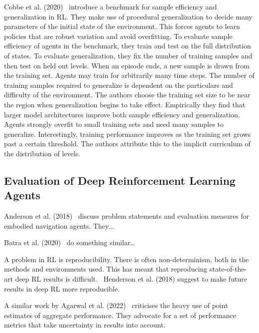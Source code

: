 
Cobbe et al. (2020)~\cite{cobbe_procgen_2020} introduce a benchmark for sample efficiency and generalization in RL.
They make use of procedural generalization to decide many parameters of the initial state of the environment.
This forces agents to learn policies that are robust variation and avoid overfitting.
To evaluate sample efficiency of agents in the benchmark, they train and test on the full distribution of states.
To evaluate generalization, they fix the number of training samples and then test on held out levels.
When an episode ends, a new sample is drawn from the training set.
Agents may train for arbitrarily many time steps.
The number of training samples required to generalize is dependent on the particulars and difficulty of the environment.
The authors choose the training set size to be near the region when generalization begins to take effect.
Empirically they find that larger model architectures improve both sample efficiency and generalization.
Agents strongly overfit to small training sets and need many samples to generalize.
Interestingly, training performance improves as the training set grows past a certain threshold.
The authors attribute this to the implicit curriculum of the distribution of levels.

\subsection{Evaluation of Deep Reinforcement Learning Agents}

Anderson et al. (2018)~\cite{anderson_evaluation_2018} discuss problem statements and evaluation measures for embodied navigation agents.
They...

Batra et al. (2020)~\cite{batra_evaluation_2020} do something similar\dots

A problem in RL is reproducibility.
There is often non-determinism, both in the methods and environments used.
This has meant that reproducing state-of-the-art deep RL results is difficult.~\cite{henderson_matters_2018}
Henderson et al. (2018) suggest to make future results in deep RL more reproducible.

A similar work by Agarwal et al. (2022)~\cite{agarwal_rlliable_2022} criticises the heavy use of point estimates of aggregate performance.
They advocate for a set of performance metrics that take uncertainty in results into account. 